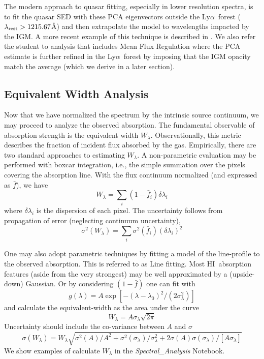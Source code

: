 \documentclass[graybox]{svmult}
\newcommand{\HI}{H{\sc I}}
\def\lya{Ly$\alpha$}
\def\smm{\sum\limits}
\begin{document}
The modern approach to quasar fitting, especially in 
lower resolution spectra, is to fit the quasar SED
with these PCA eigenvectors outside the \lya\ forest
($\lambda_{\rm rest} > 1215.67$\AA) and then extrapolate
the model to wavelengths impacted by the IGM.
A more recent example of this technique is described
in \cite{paris11}.  We also refer the student to analysis
that includes Mean Flux Regulation \cite{lee+12} where the
PCA estimate is further refined in the \lya\ forest by
imposing that the IGM opacity match the average (which
we derive in a later section).

\subsection{Equivalent Width Analysis}

Now that we have normalized the spectrum by the
intrinsic source continuum, we may proceed to analyze
the observed absorption.  The fundamental observable
of absorption strength is the equivalent width $W_\lambda$.
Observationally, this metric describes the fraction of
incident flux absorbed by the gas.  Empirically, there
are two standard approaches to estimating $W_\lambda$.
A non-parametric evaluation may be performed with
boxcar integration, i.e.,
the simple summation over the pixels covering the absorption line.
With the flux continuum normalized  (and expressed as $\bar f$),
we have
\begin{equation}
W_\lambda = \smm_i (1- \bar f_i) \delta\lambda_i
\label{eqn:EWtwo}
\end{equation}
where $\delta\lambda_i$ is the dispersion of each pixel.
The uncertainty follows from propagation of error (neglecting
continuum uncertainty),
\begin{equation}
\sigma^2(W_\lambda) = \smm_i \sigma^2(\bar f_i) (\delta\lambda_i)^2
\label{eqn:sigEW}
\end{equation}

One may also adopt parametric techniques by fitting a model
of the line-profile to the observed absorption.  This is
referred to as Line fitting.  Most \HI\ absorption features
(aside from the very strongest) may be
well approximated by a (upside-down) Gaussian.  Or by   
considering $(1-\bar f)$ one can fit with
\begin{equation}
g(\lambda) = A \exp[- (\lambda-\lambda_0)^2 / (2 \sigma_\lambda^2)]
\end{equation}
and calculate the equivalent-width as the 
area under the curve
\begin{equation}
W_\lambda = A \sigma_\lambda \sqrt{2 \pi}
\end{equation}
Uncertainty should include the co-variance between $A$ and $\sigma$
\begin{equation}
\sigma(W_\lambda) = W_\lambda \sqrt{\sigma^2(A)/A^2 +
		\sigma^2(\sigma_\lambda)/\sigma_\lambda^2 + 2 \sigma(A)\sigma(\sigma_\lambda)/[A \sigma_\lambda]}
\end{equation}
We show examples of calculate $W_\lambda$ in the
{\it Spectral\_Analysis} Notebook.
\end{document}
